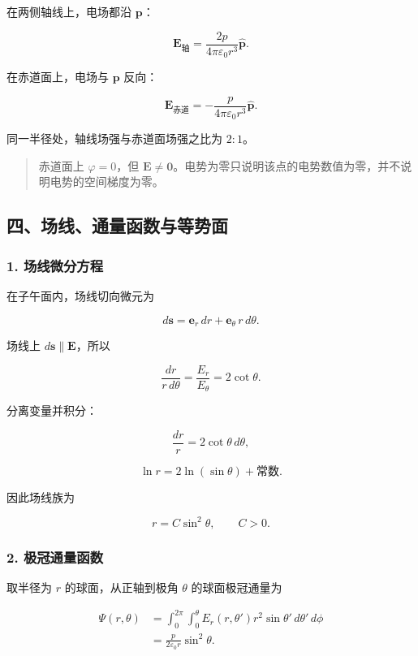 在两侧轴线上，电场都沿 \(\mathbf p\)：

\[
\boxed{
\mathbf E_{\mathrm{\text{轴}}}
=\frac{2p}{4\pi\varepsilon_0r^3}\hat{\mathbf p}
}.
\]

在赤道面上，电场与 \(\mathbf p\) 反向：

\[
\boxed{
\mathbf E_{\mathrm{\text{赤道}}}
=-\frac{p}{4\pi\varepsilon_0r^3}\hat{\mathbf p}
}.
\]

同一半径处，轴线场强与赤道面场强之比为 \(2:1\)。

\begin{quote}
赤道面上 \(\varphi=0\)，但
\(\mathbf E\neq\mathbf0\)。电势为零只说明该点的电势数值为零，并不说明电势的空间梯度为零。
\end{quote}

\subsection{四、场线、通量函数与等势面}\label{m2:ux56dbux573aux7ebfux901aux91cfux51fdux6570ux4e0eux7b49ux52bfux9762}

\subsubsection{1.
场线微分方程}\label{m2:ux573aux7ebfux5faeux5206ux65b9ux7a0b}

在子午面内，场线切向微元为

\[
d\mathbf s=\mathbf e_r\,dr+\mathbf e_{\theta}\,r\,d\theta.
\]

场线上 \(d\mathbf s\parallel\mathbf E\)，所以

\[
\frac{dr}{r\,d\theta}
=\frac{E_r}{E_{\theta}}
=2\cot\theta.
\]

分离变量并积分：

\[
\frac{dr}{r}=2\cot\theta\,d\theta,
\]

\[
\ln r=2\ln(\sin\theta)+\text{常数}.
\]

因此场线族为

\[
\boxed{r=C\sin^2\theta},
\qquad C>0.
\]

\subsubsection{2.
极冠通量函数}\label{m2:ux6781ux51a0ux901aux91cfux51fdux6570}

取半径为 \(r\) 的球面，从正轴到极角 \(\theta\) 的球面极冠通量为

\[
\begin{aligned}
\Psi(r,\theta)
&=\int_0^{2\pi}\int_0^{\theta}
E_r(r,\theta')r^2\sin\theta'\,d\theta'\,d\phi\\
&=\frac{p}{2\varepsilon_0r}\sin^2\theta.
\end{aligned}
\]

